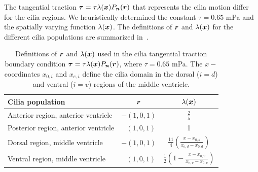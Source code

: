 \documentclass{WileyMSP-template}
\begin{document}
The tangential traction $\bm{\tau} = \tau\lambda(\bm{x}) P_{\bm{n}}(\bm{r})$ that represents the cilia
motion differ for the cilia regions. We heuristically determined the constant $\tau= 0.65$ mPa
and the spatially varying function $\lambda(\bm{x})$. The definitions of $\bm{r}$ and $\lambda(\bm{x})$
for the different cilia populations are summarized in~.
\begingroup
\setlength{\tabcolsep}{20pt}
\renewcommand{\arraystretch}{1.5}
\begin{table}[H]
    \centering
    \caption{Definitions of $\bm{r}$ and $\lambda(\bm{x})$ used in the cilia tangential 
    traction boundary condition $\bm{\tau} = \tau\lambda(\bm{x})P_{\bm{n}}(\bm{r})$,
    where $\tau=0.65$ mPa. The $x-$coordinates $x_{0, i}$ and $x_{e, i}$ define 
    the cilia domain in the dorsal ($i=d$) and ventral ($i=v$) regions of 
    the middle ventricle.}\label{tab:r_vector_and_lambda_function}
    \begin{tabular}{lcc}
        \toprule
        Cilia population & $\bm{r}$ & $\lambda(\bm{x})$ \\
        \midrule 
        Anterior region, anterior ventricle 
        & $-(1, 0, 1)$ & $\frac{2}{5}$ \\
        Posterior region, anterior ventricle
        & $\ \ \ (1, 0, 1)$ & 1 \\
        Dorsal region, middle ventricle     
        & $-(1, 0, 1)$
        & $\frac{11}{4}\left(\frac{x-x_{0, d}}{x_{e, d} - x_{0, d}}\right)$\\
        Ventral region, middle ventricle    
        & $\ \ \ (1, 0, 1)$
        & $\frac{1}{2}\left(1 - \frac{x-x_{0, v}}{x_{e, v} - x_{0, v}}\right)$ \\
        \bottomrule
    \end{tabular}
\end{table}
\endgroup
\end{document}
